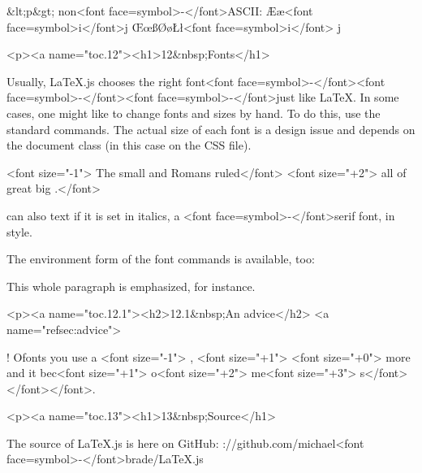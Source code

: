 &lt;p&gt;
non<font face=symbol>-</font>ASCII:
\AE \ae \IJ <font face=symbol>i</font>j \OE \oe \TH \th \SS \ss \DH \dh \O \o \DJ \dj \L \l <font face=symbol>i</font> j \NG \ng


<p><a name="toc.12"><h1>12&nbsp;Fonts</h1>

Usually, \LaTeX.js chooses the right font<font face=symbol>-</font><font face=symbol>-</font><font face=symbol>-</font>just like \LaTeX.  In some cases,
one might like to change fonts and sizes by hand. To do this, use the standard
commands. The actual size of each font is a design issue and depends
on the document class (in this case on the CSS file).

<font size="-1"> The small and
  \textbfbold Romans ruled</font>
  <font size="+2"> all of great big
  \textitItaly.</font>

\textitYou can also
  \emphemphasize text if
  it is set in italics,
  \textsfin a
  \emphsans<font face=symbol>-</font>serif font,
  \textttor in
  \emphtypewriter style.

The environment form of the font commands is available, too:

\begincenter
\beginitshape
This whole paragraph is emphasized, for instance.
\enditshape
\endcenter


<p><a name="toc.12.1"><h2>12.1&nbsp;An advice</h2>
<a name="refsec:advice">
    
\begincenter
  \underline\textbfRemember\Huge! \textitThe
  \textsfM\textbf\LARGE O\textttR\textslE fonts \Huge you
  \tiny use \footnotesize \textbfin a <font size="-1"> \textttdocument,
  <font size="+1"> \textitthe <font size="+0"> more \textscreadable and
  \textsl\textsfbeautiful it bec<font size="+1"> o<font size="+2"> m\LARGE e<font size="+3"> s</font></font></font>.
\endcenter


\appendix

<p><a name="toc.13"><h1>13&nbsp;Source</h1>

The source of \LaTeX.js is here on GitHub: \urlhttps://github.com/michael<font face=symbol>-</font>brade/LaTeX.js

\enddocument

